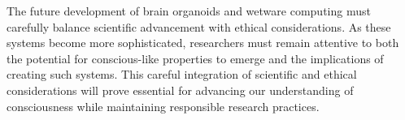 The future development of brain organoids and wetware computing must carefully balance scientific advancement with ethical considerations. As these systems become more sophisticated, researchers must remain attentive to both the potential for conscious-like properties to emerge and the implications of creating such systems. This careful integration of scientific and ethical considerations will prove essential for advancing our understanding of consciousness while maintaining responsible research practices.